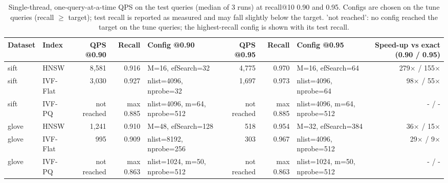 \begin{table}[t]
\centering
\small
\begin{adjustbox}{max width=\linewidth}
\begin{tabular}{llrrp{2.6cm}rrp{2.6cm}r}
\toprule
Dataset & Index & QPS @0.90 & Recall & Config @0.90 & QPS @0.95 & Recall & Config @0.95 & Speed-up vs exact (0.90 / 0.95) \\
\midrule
sift & HNSW & 8,581 & 0.916 & M=16, efSearch=32 & 4,775 & 0.970 & M=16, efSearch=64 & 279$\times$ / 155$\times$ \\
sift & IVF-Flat & 3,030 & 0.927 & nlist=4096, nprobe=32 & 1,697 & 0.973 & nlist=4096, nprobe=64 & 98$\times$ / 55$\times$ \\
sift & IVF-PQ & not reached & max 0.885 & nlist=4096, m=64, nprobe=512 & not reached & max 0.885 & nlist=4096, m=64, nprobe=512 & - / - \\
glove & HNSW & 1,241 & 0.910 & M=48, efSearch=128 & 518 & 0.954 & M=32, efSearch=384 & 36$\times$ / 15$\times$ \\
glove & IVF-Flat & 995 & 0.909 & nlist=8192, nprobe=256 & 303 & 0.967 & nlist=4096, nprobe=512 & 29$\times$ / 9$\times$ \\
glove & IVF-PQ & not reached & max 0.863 & nlist=1024, m=50, nprobe=512 & not reached & max 0.863 & nlist=1024, m=50, nprobe=512 & - / - \\
\bottomrule
\end{tabular}
\end{adjustbox}
\caption{Single-thread, one-query-at-a-time QPS on the test queries (median of 3 runs) at recall@10 0.90 and 0.95. Configs are chosen on the tune queries (recall $\geq$ target); test recall is reported as measured and may fall slightly below the target. 'not reached': no config reached the target on the tune queries; the highest-recall config is shown with its test recall.}
\label{tab:part2_qps}
\end{table}
